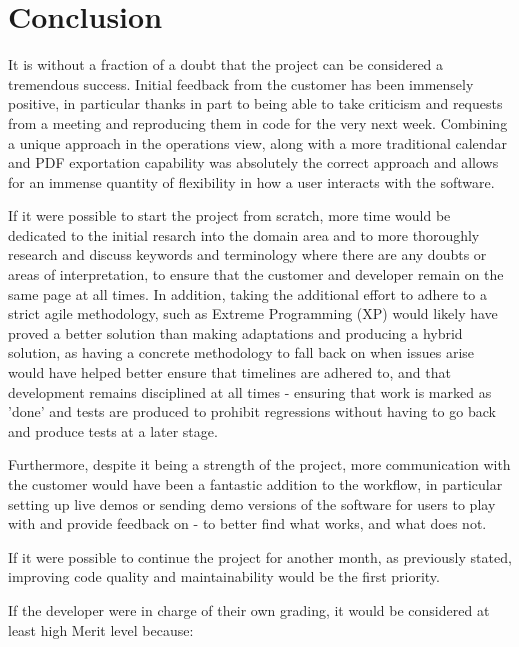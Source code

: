 \chapter{Conclusion}

It is without a fraction of a doubt that the project can be considered a tremendous success. Initial feedback from the customer has been immensely positive, in particular thanks in part to being able to take criticism and requests from a meeting and reproducing them in code for the very next week. Combining a unique approach in the operations view, along with a more traditional calendar and PDF exportation capability was absolutely the correct approach and allows for an immense quantity of flexibility in how a user interacts with the software.

If it were possible to start the project from scratch, more time would be dedicated to the initial resarch into the domain area and to more thoroughly research and discuss keywords and terminology where there are any doubts or areas of interpretation, to ensure that the customer and developer remain on the same page at all times. In addition, taking the additional effort to adhere to a strict agile methodology, such as Extreme Programming (XP) would likely have proved a better solution than making adaptations and producing a hybrid solution, as having a concrete methodology to fall back on when issues arise would have helped better ensure that timelines are adhered to, and that development remains disciplined at all times - ensuring that work is marked as 'done' and tests are produced to prohibit regressions without having to go back and produce tests at a later stage.

Furthermore, despite it being a strength of the project, more communication with the customer would have been a fantastic addition to the workflow, in particular setting up live demos or sending demo versions of the software for users to play with and provide feedback on - to better find what works, and what does not.

If it were possible to continue the project for another month, as previously stated, improving code quality and maintainability would be the first priority.

If the developer were in charge of their own grading, it would be considered at least high Merit level because:

